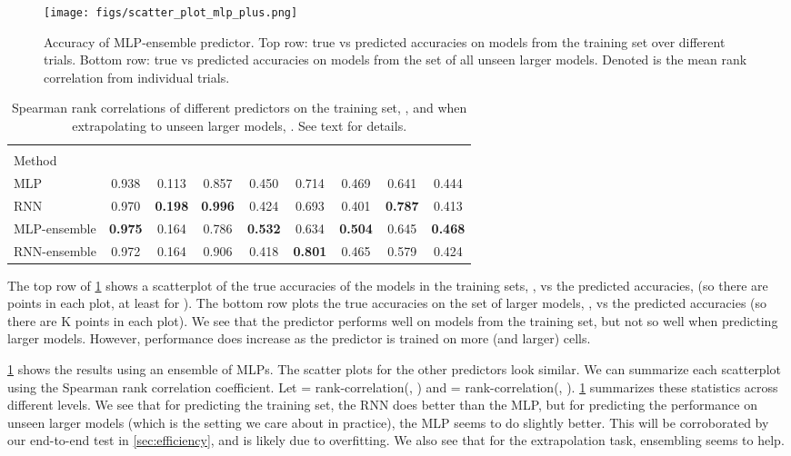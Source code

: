 \documentclass[runningheads]{llncs}
\begin{document}
\begin{figure}[t]
\centering
\texttt{[image: figs/scatter\_plot\_mlp\_plus.png]}
\caption{Accuracy of MLP-ensemble predictor.
Top row: true vs predicted accuracies on models from the training set over different trials.
Bottom row:  true vs predicted accuracies on models from the set of all unseen larger models. Denoted is the mean rank correlation from individual trials.
}
\label{fig:MLP}
\end{figure}


\begin{table}[t]
\begin{center}
\begin{tabular}{l|cc|cc|cc|cc|}
\toprule
&
\multicolumn{2}{|c|}{}
&
\multicolumn{2}{|c|}{}
&
\multicolumn{2}{|c|}{}
&
\multicolumn{2}{|c|}{}
\\
Method
&  & 
&  & 
&  & 
&  & 
\\
\midrule
MLP & 0.938 & 0.113 & 0.857 & 0.450 & 0.714 & 0.469 & 0.641 & 0.444 \\
RNN & 0.970 & {\bf 0.198} & {\bf 0.996} & 0.424 & 0.693 & 0.401 & {\bf 0.787} & 0.413 \\
MLP-ensemble & 
{\bf 0.975} & 0.164 & 0.786 & {\bf 0.532} & 0.634 & {\bf 0.504} & 0.645 & {\bf 0.468} \\
RNN-ensemble &
0.972 & 0.164 & 0.906 & 0.418 & {\bf 0.801} & 0.465 & 0.579 & 0.424 \\
\bottomrule
\end{tabular}
\end{center}
\caption{Spearman rank correlations of different predictors
on the training set, ,
and when extrapolating to unseen larger models,
.
See text for details.
}
\label{tab:spearman}
\end{table}

The top row of \cref{fig:MLP} shows a scatterplot of
the true accuracies of the models in the training sets, ,
vs the predicted accuracies,
 (so there are  points in each plot,
at least for ).
The bottom row plots 
the true accuracies on the set of larger models,
,
vs the predicted accuracies
 (so there are K points in each plot).
We see that the predictor performs well on models from the training set,
but not so well when predicting larger models.
However, performance does increase as the predictor is trained on 
more (and larger) cells.

\cref{fig:MLP} shows the results
using an ensemble of MLPs.
The scatter plots for the other predictors look similar.
We can summarize each scatterplot using the Spearman rank correlation coefficient.
Let   = rank-correlation(,  )
and
  = rank-correlation(,  ).
\cref{tab:spearman} summarizes these statistics across different levels.
We  see that for predicting the training set, the RNN does better than the MLP,
but for predicting the performance on unseen larger models
(which is the setting we care about in practice),
the MLP seems to do slightly better.
This will be corroborated by our end-to-end test in \cref{sec:efficiency}, and is likely due to overfitting.
We also see that for the extrapolation task, ensembling seems to help.
\end{document}
